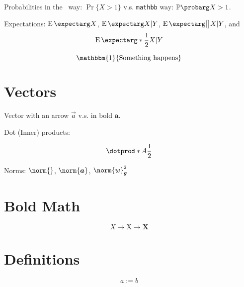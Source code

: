 \documentclass{article}
\begin{document}
Probabilities in the \LaTeXe\ way: $\Pr\{X > 1\}$ v.s.
\verb|mathbb| way: $\P{X>1}$.

Expectations: $\E{X}$, $\E{X|Y}$, $\E[\big]{X|Y}$, and
\[
\E*{\frac{1}{2} X | Y}
\]

\newcommand*{\Ind}[1]{\mathbbm{1}\{#1\}}

\[
\Ind{\text{Something happens}}
\]

\section{Vectors}

\let\arrvec\vec
\renewcommand*{\vec}{\bm}

Vector with an arrow $\arrvec{a}$ v.s. in bold $\vec{a}$.

Dot (Inner) products:

\DeclarePairedDelimiterX{}

\[
\dotprod*{A}{\frac{1}{2}}
\]

\DeclarePairedDelimiterX\norm[1]\lVert{}

Norms: $\norm{}$, $\norm{\vec{a}}$, $\norm{w}_{\vec{g}}^2$

\section{Bold Math}

{\boldmath
$$ X \rightarrow \mathrm{X} \rightarrow \mathbf{X} $$
}

\section{Definitions}
\[
a := b
\]

\appendix


%
%
\end{document}
